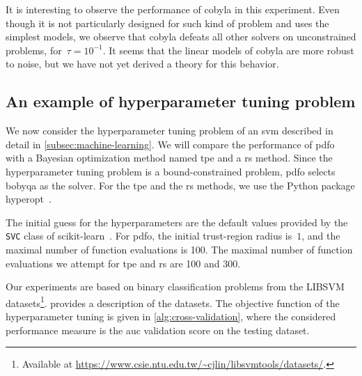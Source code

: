 It is interesting to observe the performance of \gls{cobyla} in this experiment.
Even though it is not particularly designed for such kind of problem and uses the simplest models, we observe that \gls{cobyla} defeats all other solvers on unconstrained problems, for~$\tau = 10^{-1}$.
It seems that the linear models of \gls{cobyla} are more robust to noise, but we have not yet derived a theory for this behavior.

\subsection{An example of hyperparameter tuning problem}

We now consider the hyperparameter tuning problem of an \gls{svm} described in detail in \cref{subsec:machine-learning}.
We will compare the performance of \gls{pdfo} with a Bayesian optimization method named \gls{tpe} and a \gls{rs} method.
Since the hyperparameter tuning problem is a bound-constrained problem, \gls{pdfo} selects \gls{bobyqa} as the solver.
For the \gls{tpe} and the \gls{rs} methods, we use the Python package hyperopt~\cite{Bergstra_Yamins_Cox_2013}.

The initial guess for the hyperparameters are the default values provided by the \texttt{SVC} class of scikit-learn~\cite{Pedregosa_Etal_2011}.
For \gls{pdfo}, the initial trust-region radius is~$1$, and the maximal number of function evaluations is \num{100}.
The maximal number of function evaluations we attempt for \gls{tpe} and \gls{rs} are \num{100} and \num{300}.

Our experiments are based on binary classification problems from the LIBSVM datasets\footnote{Available at \url{https://www.csie.ntu.edu.tw/~cjlin/libsvmtools/datasets/}.}.
 provides a description of the datasets.
The objective function of the hyperparameter tuning is given in \cref{alg:cross-validation}, where the considered performance measure is the \gls{auc} validation score on the testing dataset.

